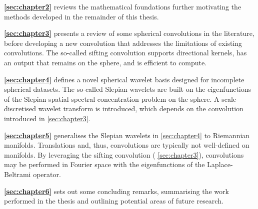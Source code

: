 \begin{hangparas}{24pt}{1}
	\textbf{\cref{sec:chapter2}} reviews the mathematical foundations further motivating the methods developed in the remainder of this thesis.

	\textbf{\cref{sec:chapter3}} presents a review of some spherical convolutions in the literature, before developing a new convolution that addresses the limitations of existing convolutions.
	The so-called sifting convolution supports directional kernels, has an output that remains on the sphere, and is efficient to compute.

	\textbf{\cref{sec:chapter4}} defines a novel spherical wavelet basis designed for incomplete spherical datasets.
	The so-called Slepian wavelets are built on the eigenfunctions of the Slepian spatial-spectral concentration problem on the sphere.
	A scale-discretised wavelet transform is introduced, which depends on the convolution introduced in \cref{sec:chapter3}.

	\textbf{\cref{sec:chapter5}} generalises the Slepian wavelets in \cref{sec:chapter4} to Riemannian manifolds.
	Translations and, thus, convolutions are typically not well-defined on manifolds.
	By leveraging the sifting convolution (\cf{} \cref{sec:chapter3}), convolutions may be performed in Fourier space with the eigenfunctions of the Laplace-Beltrami operator.

	\textbf{\cref{sec:chapter6}} sets out some concluding remarks, summarising the work performed in the thesis and outlining potential areas of future research.
\end{hangparas}
